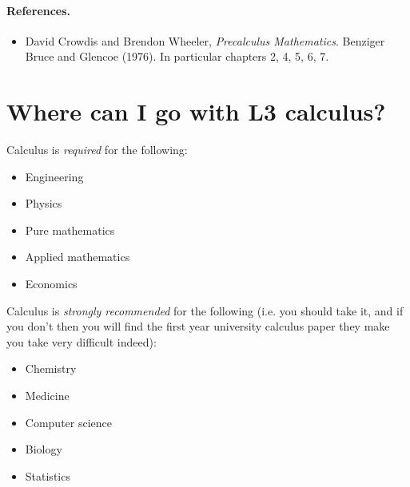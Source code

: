 \documentclass{exam}
\theoremstyle{definition}
\begin{document}
\paragraph{References.}
\begin{itemize}
  \item David Crowdis and Brendon Wheeler, \textit{Precalculus Mathematics}. Benziger Bruce and Glencoe (1976). In particular chapters 2, 4, 5, 6, 7.
\end{itemize}

\section*{Where can I go with L3 calculus?}
Calculus is \emph{required} for the following:
\begin{itemize}
  \item Engineering
  \item Physics
  \item Pure mathematics
  \item Applied mathematics
  \item Economics
\end{itemize}

Calculus is \emph{strongly recommended} for the following (i.e. you should take it, and if you don't
then you will find the first year university calculus paper they make you take very difficult indeed):
\begin{itemize}
  \item Chemistry
  \item Medicine
  \item Computer science
  \item Biology
  \item Statistics
\end{itemize}
\end{document}
